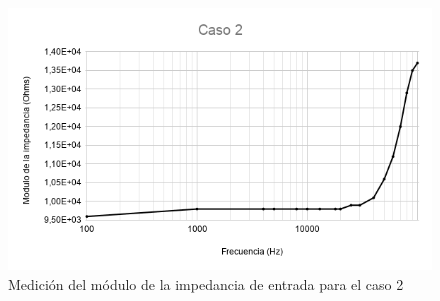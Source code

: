 \begin{figure}[H]
\begin{centering}
\includegraphics[scale=0.5]{../Ex1/iA/Resources1a/zinpm2_med}
\par\end{centering}
\caption{Medición del módulo de la impedancia de entrada para el caso 2}

\end{figure}

